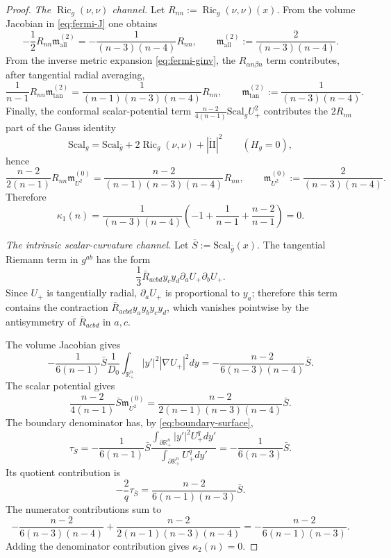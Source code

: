 \documentclass[11pt,reqno,a4paper]{amsart}
\newcommand{\R}{\mathbb{R}}
\DeclareMathOperator{\Ric}{Ric}
\numberwithin{equation}{section}
\theoremstyle{plain}
\newcommand{\Scal}{\mathrm{Scal}}
\theoremstyle{remark}
\theoremstyle{plain}
\begin{document}
\begin{proof}
\smallskip
\noindent\emph{The $\Ric_g(\nu,\nu)$ channel.}
Let $R_{nn}:=\Ric_g(\nu,\nu)(x)$.  From the volume Jacobian in
\eqref{eq:fermi-J} one obtains
\[
-\frac12 R_{nn}\mathfrak m_{\mathrm{all}}^{(2)}
=-\frac{1}{(n-3)(n-4)}R_{nn},
\qquad
\mathfrak m_{\mathrm{all}}^{(2)}:=\frac{2}{(n-3)(n-4)}.
\]
From the inverse metric expansion \eqref{eq:fermi-ginv}, the $R_{\alpha n\beta n}$
term contributes, after tangential radial averaging,
\[
\frac{1}{n-1}R_{nn}\mathfrak m_{\tan}^{(2)}
=\frac{1}{(n-1)(n-3)(n-4)}R_{nn},
\qquad
\mathfrak m_{\tan}^{(2)}:=\frac{1}{(n-3)(n-4)}.
\]
Finally, the conformal scalar-potential term
$\frac{n-2}{4(n-1)}\Scal_gU_+^2$ contributes the $2R_{nn}$ part of the Gauss
identity
\[
\Scal_g=\Scal_{\bar g}+2\Ric_g(\nu,\nu)+|\mathring{\mathrm{II}}|^2
\qquad (H_g=0),
\]
hence
\[
\frac{n-2}{2(n-1)}R_{nn}\mathfrak m_{U^2}^{(0)}
=\frac{n-2}{(n-1)(n-3)(n-4)}R_{nn},
\qquad
\mathfrak m_{U^2}^{(0)}:=\frac{2}{(n-3)(n-4)}.
\]
Therefore
\[
\kappa_1(n)=\frac{1}{(n-3)(n-4)}
\left(-1+\frac{1}{n-1}+\frac{n-2}{n-1}\right)=0.
\]

\smallskip
\noindent\emph{The intrinsic scalar-curvature channel.}
Let $\bar S:=\Scal_{\bar g}(x)$.  The tangential Riemann term in
$g^{ab}$ has the form
\[
\frac13\bar R_{acbd}y_cy_d\partial_aU_+\partial_bU_+ .
\]
Since $U_+$ is tangentially radial, $\partial_aU_+$ is proportional to $y_a$;
therefore this term contains the contraction
$\bar R_{acbd}y_ay_by_cy_d$, which vanishes pointwise by the antisymmetry of
$\bar R_{acbd}$ in $a,c$.

The volume Jacobian gives
\[
-\frac{1}{6(n-1)}\bar S
\frac{1}{D_0}\int_{\R^n_+}|y'|^2|\nabla U_+|^2dy
=-\frac{n-2}{6(n-3)(n-4)}\bar S.
\]
The scalar potential gives
\[
\frac{n-2}{4(n-1)}\bar S
\mathfrak m_{U^2}^{(0)}
=\frac{n-2}{2(n-1)(n-3)(n-4)}\bar S.
\]
The boundary denominator has, by \eqref{eq:boundary-surface},
\[
\tau_{\bar S}
=-\frac{1}{6(n-1)}\bar S
\frac{\int_{\partial\R^n_+}|y'|^2U_+^qdy'}
{\int_{\partial\R^n_+}U_+^qdy'}
=-\frac{1}{6(n-3)}\bar S.
\]
Its quotient contribution is
\[
-\frac2q\tau_{\bar S}
=\frac{n-2}{6(n-1)(n-3)}\bar S.
\]
The numerator contributions sum to
\[
-\frac{n-2}{6(n-3)(n-4)}
+\frac{n-2}{2(n-1)(n-3)(n-4)}
=-\frac{n-2}{6(n-1)(n-3)}.
\]
Adding the denominator contribution gives $\kappa_2(n)=0$.


\end{proof}
\end{document}

